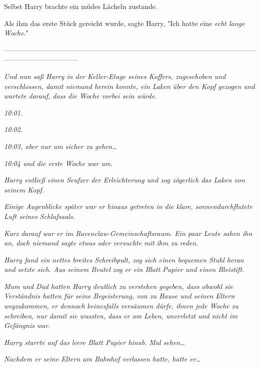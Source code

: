 {Selbst Harry brachte ein müdes Lächeln zustande.

Als ihm das erste Stück gereicht wurde, sagte Harry, "Ich hatte eine \emph{echt lange Woche.}"

--------------------------------------------------------------------------------------------------------------------------------------------

\emph{Und nun saß Harry in der Keller-Etage seines Koffers, zugeschoben und verschlossen, damit niemand herein konnte, ein Laken über den Kopf gezogen und wartete darauf, dass die Woche vorbei sein würde.}

\emph{10:01.}

\emph{10:02.}

\emph{10:03, aber nur um sicher zu gehen…}

\emph{10:04 und die erste Woche war um.}

\emph{Harry entließ einen Seufzer der Erleichterung und zog zögerlich das Laken von seinem Kopf.}

\emph{Einige Augenblicke später war er hinaus getreten in die klare, sonnendurchflutete Luft seines Schlafsaals.}

\emph{Kurz darauf war er im Ravenclaw-Gemeinschaftsraum. Ein paar Leute sahen ihn an, doch niemand sagte etwas oder versuchte mit ihm zu reden.}

\emph{Harry fand ein nettes breites Schreibpult, zog sich einen bequemen Stuhl heran und setzte sich. Aus seinem Beutel zog er ein Blatt Papier und einen Bleistift.}

\emph{Mum und Dad hatten Harry} \emph{deutlich zu verstehen gegeben, dass obwohl sie Verständnis hatten für seine Begeisterung, von zu Hause und seinen Eltern wegzukommen, er dennoch} \emph{\emph{keinesfalls}} \emph{\emph{versäumen dürfe, ihnen jede Woche}} \emph{zu schreiben,} \emph{nur damit sie wussten, dass er am Leben, unverletzt und nicht im Gefängnis war.}

\emph{Harry starrte auf das leere Blatt Papier hinab.} \emph{\emph{Mal sehen…}}

\emph{Nachdem er seine Eltern am Bahnhof verlassen hatte, hatte er…}

}
